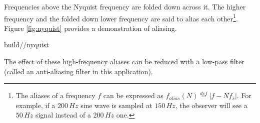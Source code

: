 Frequencies above the Nyquist frequency are folded down across it. The higher
frequency and the folded down lower frequency are said to alias each
other\footnote{The aliases of a frequency $f$ can be expressed as
$f_{alias}(N) \stackrel{def}{=} |f - Nf_s|$. For example, if a $200\,Hz$ sine
wave is sampled at $150\,Hz$, the \gls{observer} will see a $50\,Hz$ signal
instead of a $200\,Hz$ one.}. Figure \ref{fig:nyquist} provides a demonstration
of aliasing.
\begin{svg}{build/\chapterpath/nyquist}
  \caption{The samples of two sine waves can be identical when at least one of
    them is at a frequency above half the sample rate. In this case, the $2\,Hz$
    sine wave is above the Nyquist frequency $1.5\,Hz$.}
  \label{fig:nyquist}
\end{svg}

The effect of these high-frequency aliases can be reduced with a low-pass filter
(called an anti-aliasing filter in this application).
